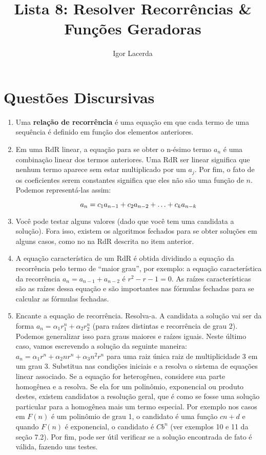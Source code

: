 \documentclass{article}
\title{Lista 8: Resolver Recorrências \& Funções Geradoras}
\author{Igor Lacerda}
\begin{document}
\maketitle

\section*{Questões Discursivas}

\begin{enumerate}

	\item Uma \textbf{relação de recorrência} é uma equação em que cada termo de uma sequência é definido em função dos elementos anteriores.

	\item Em uma RdR linear, a equação para se obter o n-ésimo termo \( a_n \) é uma combinação linear dos termos anteriores. Uma RdR ser linear significa que nenhum termo aparece sem estar multiplicado por um \( a_j \). Por fim, o fato de os coeficientes serem constantes significa que eles não são uma função de \( n \). Podemos representá-las assim:

	      \[ a_n = c_1 a_{n-1} + c_2 a_{n-2} + \mathellipsis + c_k a_{n-k} \]

	\item Você pode testar alguns valores (dado que você tem uma candidata a solução). Fora isso, existem os algoritmos fechados para se obter soluções em alguns casos, como no na RdR descrita no item anterior.

	\item A equação característica de um RdR é obtida dividindo a equação da recorrência pelo termo de ``maior grau'', por exemplo: a equação característica da recorrência \( a_n = a_{n-1} + a_{n-2} \) é \( r^2 - r - 1 = 0 \). As raízes características são as raízes dessa equação e são importantes nas fórmulas fechadas para se calcular as fórmulas fechadas.

	\item Encante a equação de recorrência. Resolva-a. A candidata a solução vai ser da forma \( a_n = \alpha_1 r^n_1 + \alpha_2 r^n_2 \) (para raízes distintas e recorrência de grau 2). Podemos generalizar isso para graus maiores e raízes iguais. Neste último caso, vamos escrevendo a solução da seguinte maneira: \( a_n = \alpha_1 r^n + \alpha_2 n r^n + \alpha_3 n^2 r^n  \) para uma raiz única raiz de multiplicidade 3 em um grau 3. Substitua nas condições iniciais e a resolva o sistema de equações linear associado. Se a equação for heterogênea, considere sua parte homogênea e a resolva. Se ela for um polinômio, exponencial ou produto destes, existem candidatos a resolução geral, que é como se fosse uma solução particular para a homogênea mais um termo especial. Por exemplo nos casos em \( F(n) \) é um polinômio de grau 1, o candidato é uma função \( cn + d \) e quando \( F(n) \) é exponencial, o candidato é \( Cb^n \) (ver exemplos 10 e 11 da seção 7.2). Por fim, pode ser útil verificar se a solução encontrada de fato é válida, fazendo uns testes.


\end{enumerate}
\end{document}
